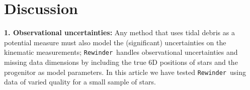 \documentclass[letterpaper,12pt,preprint]{aastex}
\newcommand{\rewinder}{\texttt{Rewinder}}
\begin{document}
%
%

\section{Discussion}\label{sec:discussion}

{\bf 1. Observational uncertainties:} Any method that uses tidal debris as a potential measure must also model the (significant) uncertainties on the kinematic measurements; \rewinder\ handles observational uncertainties and missing data dimensions by including the true 6D positions of stars and the progenitor as model parameters. In this article we have tested \rewinder\ using data of varied quality for a small sample of stars. 
\end{document}
